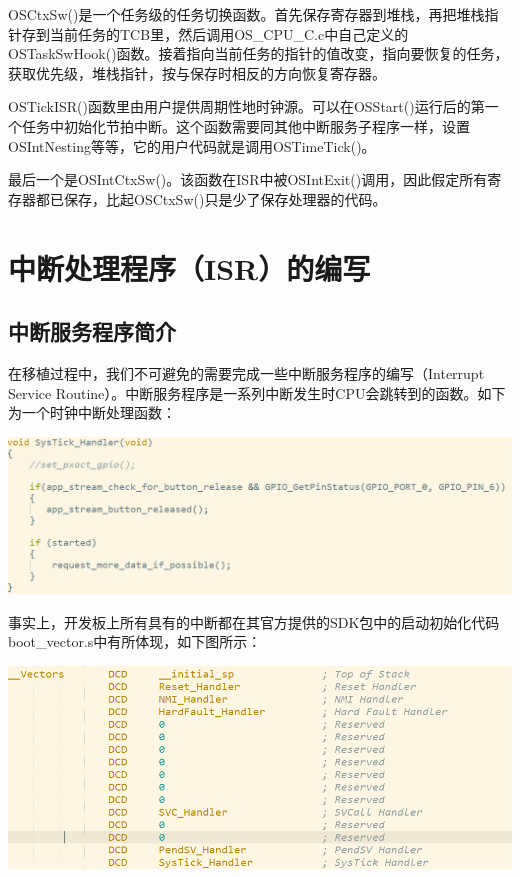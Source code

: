\documentclass{ctexart}
\begin{document}
         OSCtxSw()是一个任务级的任务切换函数。首先保存寄存器到堆栈，再把堆栈指针存到当前任务的TCB里，然后调用OS\_CPU\_C.c中自己定义的OSTaskSwHook()函数。接着指向当前任务的指针的值改变，指向要恢复的任务，获取优先级，堆栈指针，按与保存时相反的方向恢复寄存器。
        
        OSTickISR()函数里由用户提供周期性地时钟源。可以在OSStart()运行后的第一个任务中初始化节拍中断。这个函数需要同其他中断服务子程序一样，设置OSIntNesting等等，它的用户代码就是调用OSTimeTick()。
        
         最后一个是OSIntCtxSw()。该函数在ISR中被OSIntExit()调用，因此假定所有寄存器都已保存，比起OSCtxSw()只是少了保存处理器的代码。
\section{中断处理程序（ISR）的编写}
\subsection{中断服务程序简介}
在移植过程中，我们不可避免的需要完成一些中断服务程序的编写（Interrupt Service Routine）。中断服务程序是一系列中断发生时CPU会跳转到的函数。如下为一个时钟中断处理函数：

\centerline{\includegraphics[scale=0.45]{005}}\par
事实上，开发板上所有具有的中断都在其官方提供的SDK包中的启动初始化代码boot\_vector.s中有所体现，如下图所示：

\centerline{\includegraphics[scale=0.5]{006}}\par
\end{document}
